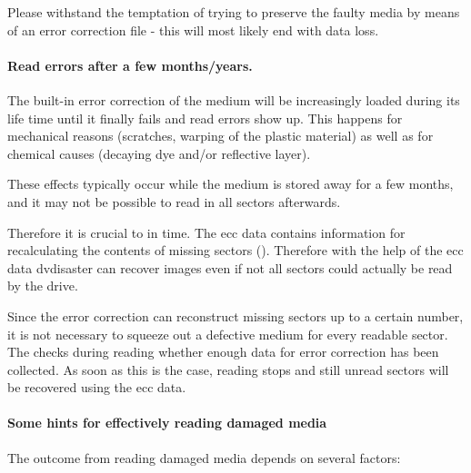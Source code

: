 \smallskip

Please withstand the temptation of trying to preserve the faulty media
by means of an error correction file - this will most likely end with data loss.

\paragraph{Read errors after a few months/years.} The built-in error correction
of the medium will be increasingly loaded during its life time until it finally
fails and read errors show up. This happens for mechanical reasons (scratches,
warping of the plastic material) as well as for chemical causes (decaying dye
and/or reflective layer).

\smallskip

These effects typically occur while the medium is stored away for a few months,
and it may not be possible to read in all sectors afterwards.

\smallskip

Therefore it is crucial to  in
time. The ecc data contains information for recalculating the contents of missing
sectors ().
Therefore with the help of the ecc data dvdisaster can recover images even
if not all sectors could actually be read by the drive.

\smallskip

Since the error correction can reconstruct missing sectors up to a certain number,
it is not necessary to squeeze out a defective medium for every readable sector.
The  checks during reading
whether enough data for error correction has been collected. As soon as this is
the case, reading stops and still unread sectors will be recovered using the ecc data.

\paragraph{Some hints for effectively reading damaged media}\quad

\medskip

The outcome from reading damaged media depends on several factors:

